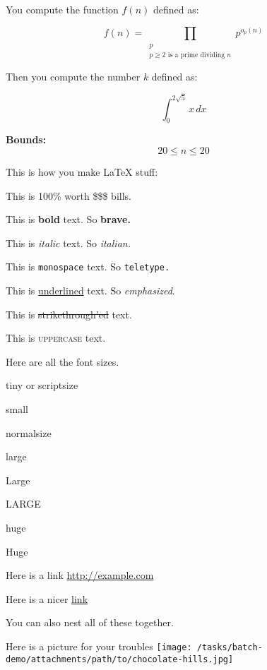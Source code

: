You compute the function $f(n)$ defined as:

$$f(n) = \prod_{\substack{p \\ p \geq 2 \text{ is a prime dividing } n}} p^{o_p(n)}$$

Then you compute the number $k$ defined as:

\[\int_{0}^{2\sqrt{5}} x \, dx\]

\large{\bf{Bounds:}}
$$ 20 \le n \le 20 $$

This is how you make LaTeX stuff:

This is 100\% worth \$\$\$ bills.

This is \textbf{bold} text. So \bf{brave}.

This is \textit{italic} text. So \it{italian}.

This is \texttt{monospace} text. So \tt{teletype}.

This is \underline{underlined} text. So \emph{emphasized}.

This is \sout{strikethrough'ed} text.

This is \textsc{uppercase} text.

Here are all the font sizes.

\tiny{tiny} or \scriptsize{scriptsize}

\small{small}

\normalsize{normalsize}

\large{large}

\Large{Large}

\LARGE{LARGE}

\huge{huge}

\Huge{Huge}


Here is a link \url{http://example.com}

Here is a nicer \href{http://example.com}{link}

You can also nest all of these together. \href{http://example.com}{}

Here is a picture for your troubles \texttt{[image: /tasks/batch-demo/attachments/path/to/chocolate-hills.jpg]}
